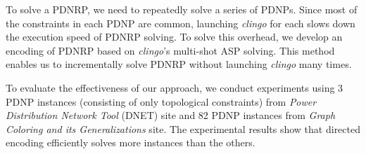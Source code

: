 \documentclass[dvipdfmx,a4paper]{jsarticle}
\begin{document}

To solve a PDNRP, we need to repeatedly solve a series of PDNPs.
%
Since most of the constraints in each PDNP are common,
launching \textit{clingo} for each slows down the execution speed of PDNRP solving.
%
To solve this overhead, we develop an encoding of PDNRP
based on \textit{clingo}'s multi-shot ASP solving.
%
This method enables us to incrementally solve PDNRP without
launching \textit{clingo} many times.

%

To evaluate the effectiveness of our approach, we conduct experiments
using 3 PDNP instances (consisting of only topological constraints)
from \textit{Power Distribution Network Tool} (DNET) site and
82 PDNP instances from
\textit{Graph Coloring and its Generalizations} site.
%
The experimental results show that \textsf{directed} encoding efficiently
solves more instances than the others.

\end{document}
